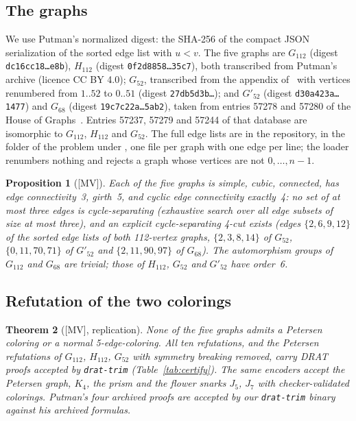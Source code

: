 \documentclass[11pt]{article}
\newtheorem{theorem}{Theorem}[section]
\newtheorem{proposition}[theorem]{Proposition}
\theoremstyle{definition}
\theoremstyle{remark}
\newcommand{\Gmain}{G_{112}}
\newcommand{\Gsym}{H_{112}}
\newcommand{\Gfty}{G_{52}}
\newcommand{\Gftyb}{G'_{52}}
\newcommand{\Gsix}{G_{68}}
\newcommand{\mv}{\textup{[MV]}}
\begin{document}
\subsection{The graphs}

We use Putman's normalized digest: the SHA-256 of the compact JSON serialization of the sorted
edge list with $u < v$. The five graphs are
$\Gmain$ (digest \texttt{dc16cc18\ldots{}e8b}), $\Gsym$ (digest \texttt{0f2d8858\ldots{}35c7}),
both transcribed from Putman's archive (licence CC BY 4.0); $\Gfty$, transcribed from the appendix
of~\cite{GJMMM2026} with vertices renumbered from $1..52$ to $0..51$ (digest
\texttt{27db5d3b\ldots}); and $\Gftyb$ (digest \texttt{d30a423a\ldots{}1477}) and $\Gsix$ (digest
\texttt{19c7c22a\ldots{}5ab2}), taken from entries 57278 and 57280 of the House of
Graphs~\cite{HoG}. Entries 57237, 57279 and 57244 of that database are isomorphic to $\Gmain$,
$\Gsym$ and $\Gfty$. The full edge lists are in the repository, in the folder of the problem under
, one file per graph with one edge per line; the loader renumbers nothing and rejects
a graph whose vertices are not $0,\dots,n-1$.

\begin{proposition}[\mv]\label{prop:structure}
Each of the five graphs is simple, cubic, connected, has edge connectivity~3, girth~5,
and cyclic edge connectivity exactly~4: no set of at most three edges is cycle-separating
(exhaustive search over all edge subsets of size at most three), and an explicit cycle-separating
4-cut exists (edges $\{2,6,9,12\}$ of the sorted edge lists of both 112-vertex graphs,
$\{2,3,8,14\}$ of $\Gfty$, $\{0,11,70,71\}$ of $\Gftyb$ and $\{2,11,90,97\}$ of $\Gsix$). The
automorphism groups of $\Gmain$ and $\Gsix$ are trivial; those of $\Gsym$, $\Gfty$ and $\Gftyb$
have order~6.
\end{proposition}

\subsection{Refutation of the two colorings}

\begin{theorem}[\mv, replication]\label{thm:certify}
None of the five graphs admits a Petersen coloring or a normal 5-edge-coloring. All ten
refutations, and the Petersen refutations of $\Gmain$, $\Gsym$, $\Gfty$ with symmetry breaking
removed, carry DRAT proofs accepted by \texttt{drat-trim} (Table~\ref{tab:certify}). The same
encoders accept the Petersen graph, $K_4$, the prism and the flower snarks $J_5$, $J_7$ with
checker-validated colorings. Putman's four archived proofs are accepted by our \texttt{drat-trim}
binary against his archived formulas.
\end{theorem}
\end{document}
